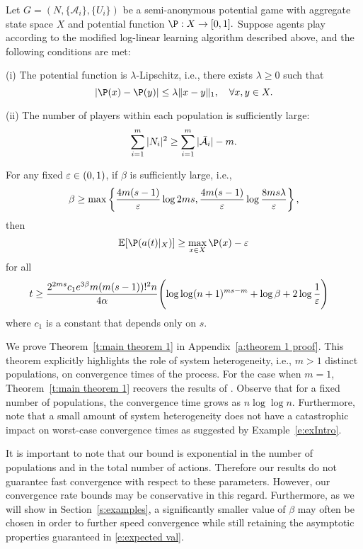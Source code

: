 \begin{Theorem}\label{t:main theorem 1}
Let $G = (N,\{\mathcal{A}_i\},\{U_i\})$ be a semi-anonymous potential game with aggregate state space $X$ and potential function $\P:X\to [0,1].$ Suppose agents play according to the modified log-linear learning algorithm described above, and the following conditions are met:         

\noindent (i)  The potential function is $\lambda$-Lipschitz, i.e., there exists $\lambda \geq 0$ such that
\begin{equation*}
|\P(x) - \P(y)|\leq\lambda\|x-y\|_1,\quad \forall x,y\in  X.
\end{equation*}

\noindent(ii) The number of players within each population is sufficiently large:
$$\sum_{i=1}^m |N_i|^2\geq \sum_{i=1}^m |\bar{{\cal A}}_i| - m.$$  

\noindent For any fixed $\varepsilon\in (0,1)$, if $\beta$ is sufficiently large, i.e., 
%
\begin{equation}\label{e:beta lb}
\beta\geq\max\left\{{4m(s-1)\over\varepsilon}\log 2ms,{4m(s-1)\over\varepsilon}\log{8ms \lambda\over\varepsilon}\right\},
\end{equation}
%
then
%
\begin{equation}\label{e:expected val}
\E[\P(a(t)|_{X})]\geq\max_{x\in X}\P(x)-\eps
\end{equation}
%
for all
%
\small
\begin{align}
t&\geq \frac{2^{2ms}c_1 e^{3\beta}m(m(s-1))!^2 n}{4\alpha}\Biggl(\log\log (n+1)^{ms - m} +\log\beta+ 2\log{1\over\varepsilon}\Biggr)\label{e:time requirement}
\end{align}
\normalsize
where $c_1$ is a constant that depends only on $s$.  
%
\end{Theorem}

We prove Theorem~\ref{t:main theorem 1} in Appendix~\ref{a:theorem 1 proof}.  This theorem explicitly highlights the role of system heterogeneity, i.e., $m>1$ distinct populations, on convergence times of the process.  For the case when $m=1$, Theorem~\ref{t:main theorem 1} recovers the results of \cite{Shah2010}.  Observe that for a fixed number of populations, the convergence time grows as $n\log\log n$.  Furthermore, note that a small amount of system heterogeneity does not have a catastrophic impact on worst-case convergence times as suggested by Example~\ref{e:exIntro}.

It is important to note that our bound is exponential in the number of populations and in the total number of actions. Therefore our results do not guarantee fast convergence with respect to these parameters. However, our convergence rate bounds may be conservative in this regard. Furthermore, as we will show in Section~\ref{s:examples}, a significantly smaller value of $\beta$ may often be chosen in order to further speed convergence while still retaining the asymptotic properties guaranteed in \eqref{e:expected val}. 


